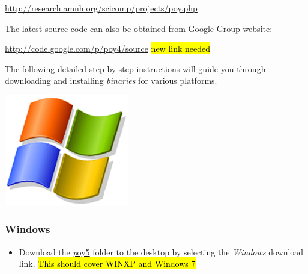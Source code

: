 \begin{center}
\url{http://research.amnh.org/scicomp/projects/poy.php}
\end{center}
The latest source code can also be obtained from \poy Google Group website:
\begin{center}
\url{http://code.google.com/p/poy4/source}
\hl{new link needed}
\end{center}
The following detailed step-by-step instructions will guide you through downloading and installing \poy \emph{binaries} for various platforms.

\begin{flushleft}
	\begin{minipage}[c]{0.074\textwidth}
	   	\includegraphics[width=\textwidth]{doc/figures/figlogowindows.jpg}
	\end{minipage}
	\quad
	\begin{minipage}[t]{0.88\textwidth}
		   	\subsubsection*{Windows}
	\end{minipage}
		\begin{itemize}
			\item
                Download the
                \href{http://research.amnh.org/scicomp/projects/poy.php}{\emph poy5} folder to the desktop by selecting the \emph{Windows} download link. \hl{This should cover WINXP and Windows 7} 


\end{itemize}
\end{flushleft}
